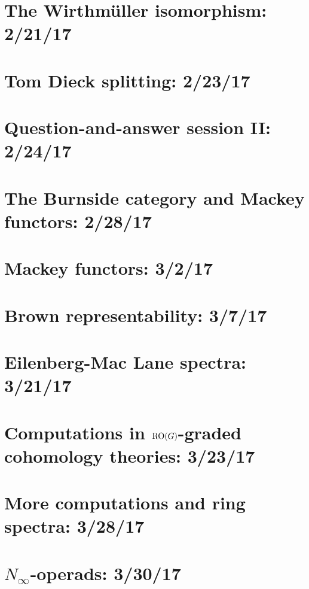 \documentclass{style_EHT}
\begin{document}
\section{The Wirthmüller isomorphism: 2/21/17}
	
\section{Tom Dieck splitting: 2/23/17}
	
\section{Question-and-answer session II: 2/24/17}
	
\section{The Burnside category and Mackey functors: 2/28/17}
	
\section{Mackey functors: 3/2/17}
	
\section{Brown representability: 3/7/17}
	
\section{Eilenberg-Mac Lane spectra: 3/21/17}
	
\section{Computations in $\mathrm{RO}(G)$-graded cohomology theories: 3/23/17}
	
\section{More computations and ring spectra: 3/28/17}
	
\section{$N_\infty$-operads: 3/30/17}
	

{}

\end{document}
